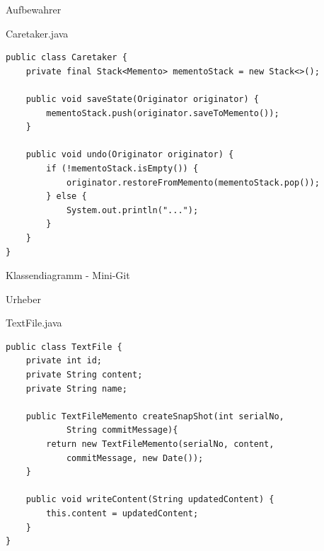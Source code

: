 \begin{frame}[fragile]{Aufbewahrer}
	\begin{exampleblock}{Caretaker.java}
 		\begin{lstlisting}
public class Caretaker {
    private final Stack<Memento> mementoStack = new Stack<>();

    public void saveState(Originator originator) {
        mementoStack.push(originator.saveToMemento());
    }

    public void undo(Originator originator) {
        if (!mementoStack.isEmpty()) {
            originator.restoreFromMemento(mementoStack.pop());
        } else {
            System.out.println("...");
        }
    }
}
 		\end{lstlisting}
 	\end{exampleblock}
\end{frame}


\begin{frame}{Klassendiagramm - Mini-Git}
\end{frame}

\begin{frame}[fragile]{Urheber}
	\begin{exampleblock}{TextFile.java}
 		\begin{lstlisting}
public class TextFile {
	private int id;
	private String content;
	private String name;
	
    public TextFileMemento createSnapShot(int serialNo, 
            String commitMessage){
        return new TextFileMemento(serialNo, content,
            commitMessage, new Date());
    }

    public void writeContent(String updatedContent) {
        this.content = updatedContent;
    }
}
 		\end{lstlisting}
 	\end{exampleblock}
\end{frame}

